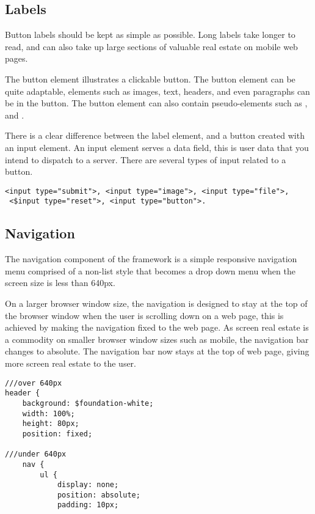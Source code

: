 \subsection*{Labels}
Button labels should be kept as simple as possible. Long labels take longer to read, and can also take up large sections of valuable real estate on mobile web pages. 

The button element illustrates a clickable button. The button element can be quite adaptable, elements such as images, text, headers, and even paragraphs can be in the button. The button element can also contain pseudo-elements such as , and . 

There is a clear difference between the label element, and a button created with an input element. An input element serves a data field, this is user data that you intend to dispatch to a server. There are several types of input related to a button.

\begin{lstlisting}[language=CSS3]
 <input type="submit">, <input type="image">, <input type="file">, 
 <$input type="reset">, <input type="button">. 
\end{lstlisting}


\newpage
\subsection*{Navigation}
The navigation component of the framework is a simple responsive navigation menu  comprised of a non-list style that becomes a drop down menu when the screen size is less than 640px.

On a larger browser window size, the navigation is designed to stay at the top of the browser window when the user is scrolling down on a web page, this is achieved by making the navigation fixed to the web page. As screen real estate is a commodity on smaller browser window sizes such as mobile, the navigation bar changes to absolute. The navigation bar now stays at the top of web page, giving more screen real estate to the user. 

\begin{lstlisting}[language=CSS3]
///over 640px
header {
	background: $foundation-white;
	width: 100%;
	height: 80px;
	position: fixed; 
	
///under 640px			
	nav {
		ul {
			display: none;
			position: absolute;
			padding: 10px;
\end{lstlisting}

